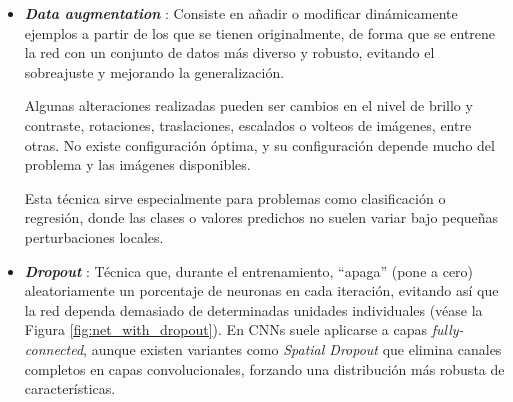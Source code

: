 \begin{itemize}

    \item \textbf{\textit{Data augmentation}} \cite{chen2019,zhang2021}: Consiste en añadir o modificar 
    dinámicamente ejemplos a partir de los que se tienen originalmente, de forma que se entrene la red con 
    un conjunto de datos más diverso y robusto, evitando el sobreajuste y mejorando la generalización.
    
    Algunas alteraciones realizadas pueden ser cambios en el nivel de brillo y contraste, rotaciones, 
    traslaciones, escalados o volteos de imágenes, entre otras. No existe configuración óptima, y su 
    configuración depende mucho del problema y las imágenes disponibles.

    Esta técnica sirve especialmente para problemas como clasificación o regresión, donde las clases o valores 
    predichos no suelen variar bajo pequeñas perturbaciones locales. 
    
    \item \textbf{\textit{Dropout}} \cite{srivastava2014}: Técnica que, durante el entrenamiento, ``apaga'' 
    (pone a cero) aleatoriamente un porcentaje de neuronas en cada iteración, evitando así que la red 
    dependa demasiado de determinadas unidades individuales (véase la Figura \ref{fig:net_with_dropout}). 
    En CNNs suele aplicarse a capas \textit{fully-connected}, 
    aunque existen variantes como \textit{Spatial Dropout} \cite{tompson2015} que elimina canales completos 
    en capas convolucionales, forzando una distribución más robusta de características.

    \begin{figure}[h]
        \centering


\end{figure}
\end{itemize}
